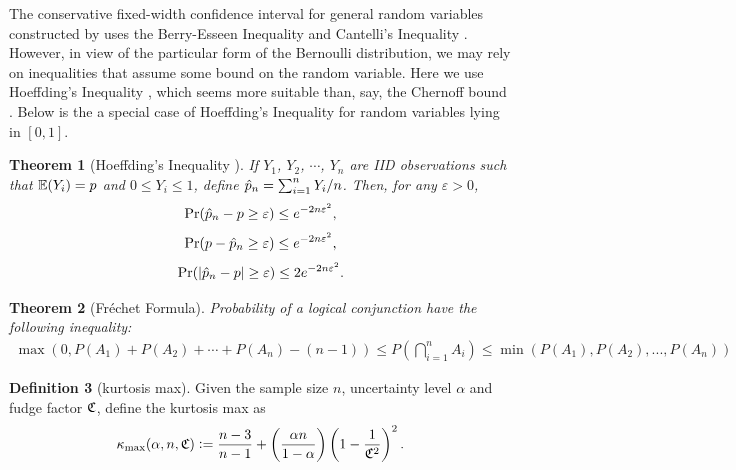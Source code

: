 \documentclass{iitthesis}
\newtheorem{theorem}{Theorem}[section]
\theoremstyle{definition}
\newtheorem{defn}[theorem]{Definition}
\begin{document}

The conservative fixed-width confidence interval for general random variables constructed by  \cite{HJLO12} uses the Berry-Esseen Inequality \cite[Section 4.1]{LB10} and Cantelli's Inequality \cite[Section 6.1]{LB10}. However, in view of the particular form of the Bernoulli distribution, we may rely on inequalities that assume some bound on the random variable.  Here we use Hoeffding's Inequality \cite{H63}, which seems more suitable than, say, the Chernoff bound \cite{chernoff52}.  Below is the a special case of Hoeffding's Inequality for random variables lying in $[0,1]$.
\begin{theorem}[Hoeffding's Inequality {\cite{H63}}] \label{hoeff}
If $Y_1$, $Y_2$, $\cdots$, $Y_n$ are IID observations such that $\mathbb{E}(Y_i)=p$ and $0 \leq Y_i \leq 1$, define $\hat{p}_n=\sum_{i=1}^n Y_i/n$. Then, for any $\varepsilon>0$, 
$$\Pr(\hat{p}_n-p \geq \varepsilon) \leq e^{-2n\varepsilon^2},$$
$$\Pr(p-\hat{p}_n \geq \varepsilon) \leq e^{-2n\varepsilon^2},$$
$$\Pr(\left \lvert \hat{p}_n-p \right \rvert \geq \varepsilon) \leq 2e^{-2n\varepsilon^2}.$$
\end{theorem}
 

\begin{theorem}[Fr\'{e}chet Formula] \cite{Frechet35}
Probability of a logical conjunction have the following inequality:
\begin{align}
\max(0, P(A_1) + P(A_2)+\cdots +P(A_n)-(n -1)) \leq P\left(\bigcap_{i=1}^n A_i\right)\leq \min(P(A_1), P(A_2), ..., P(A_n))
\end{align}
\end{theorem}


\begin{defn}[kurtosis max]
Given the sample size $n$, uncertainty level $\alpha$ and fudge factor $\mathfrak{C}$, define the kurtosis max as
\begin{equation}
\label{def:kmax}
\kappa_{\max}(\alpha, n,\mathfrak{C}):= \frac{n-3}{n-1} + \left(\frac{ \alpha n}{1-\alpha}\right) \left(1 - \frac{1}{\mathfrak{C}^2}\right)^2.
\end{equation}
\end{defn}
\end{document}
